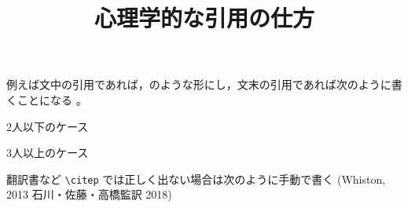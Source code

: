 \documentclass[dvipdfmx]{jsarticle}
\begin{document}
\title{心理学的な引用の仕方}
\author{}

\maketitle



例えば文中の引用であれば，\citet{Fukaya2011a}のような形にし，文末の引用であれば次のように書くことになる \citep{Hayashi2015}。

2人以下のケース \citep{Ishii2016}

3人以上のケース \citep{Ishii2017}


翻訳書など \verb+\citep+ では正しく出ない場合は次のように手動で書く (Whiston, 2013 石川・佐藤・高橋監訳 2018) \nocite{Whiston2013}



\nocite{*}
\end{document}

